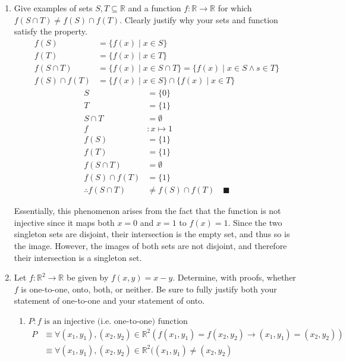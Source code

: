 \documentclass[letterpaper, 12pt]{article}
\newcommand{\qed}{\quad \blacksquare}
\newcommand{\then}{\rightarrow}
\newcommand{\R}{\mathbb{R}}
\newcommand{\0}{\emptyset}
\begin{document}
\begin{enumerate}
\begin{enumerate}
\end{enumerate}
\item Give examples of sets $S, T \subseteq \R$ and a function $f: \R \to \R$ for which 
$f(S \cap T) \ne f(S) \cap f(T)$. Clearly justify why your sets and function satisfy the property.
\begin{align*}
    f(S) &= \{f(x) \mid x \in S\} \\
    f(T) &= \{f(x) \mid x \in T\} \\
    f(S \cap T) &= \{f(x) \mid x \in S \cap T\} = \{f(x) \mid x \in S \wedge s \in T\} \\
    f(S) \cap f(T) &= \{f(x) \mid x \in S\} \cap \{f(x) \mid x \in T\}
\end{align*}
\begin{align*}
    S &= \{0\} \\
    T &= \{1\} \\
    S \cap T &= \0 \\
    f &: x \mapsto 1 \\
    f(S) &= \{1\} \\
    f(T) &= \{1\} \\
    f(S \cap T) &= \0 \\
    f(S) \cap f(T) &= \{1\} \\
    \therefore f(S \cap T) &\ne f(S) \cap f(T) \qed
\end{align*}
\begin{flushleft}
    Essentially, this phenomenon arises from the fact that the function is not injective since 
    it maps both $x = 0$ and $x = 1$ to $f(x) = 1$. Since the two singleton sets are disjoint, 
    their intersection is the empty set, and thus so is the image. However, the images of both 
    sets are not disjoint, and therefore their intersection is a singleton set.
\end{flushleft}
\pagebreak
\item Let $f: \R^2 \to \R$ be given by $f(x, y) = x - y$. Determine, with proofs, whether $f$ 
is one-to-one, onto, both, or neither. Be sure to fully justify both your statement of 
one-to-one and your statement of onto.
\begin{enumerate}
\item $P: \text{$f$ is an injective (i.e. one-to-one) function}$
\[\begin{split}
    P &\equiv \forall (x_1, y_1), (x_2, y_2) \in \R^2(f(x_1, y_1) = f(x_2, y_2) 
    \then (x_1, y_1) = (x_2, y_2)) \\
    &\equiv \forall (x_1, y_1), (x_2, y_2) \in \R^2((x_1, y_1) \ne (x_2, y_2) 

\end{split}\]
\end{enumerate}
\end{enumerate}
\end{document}
